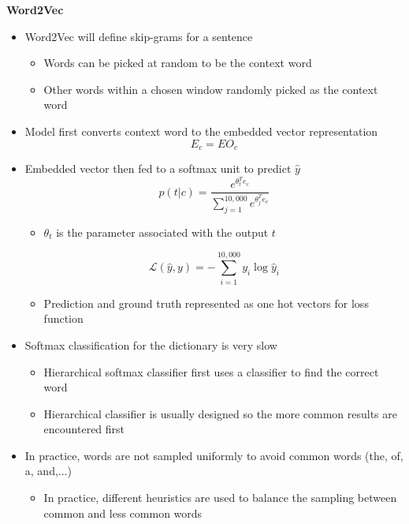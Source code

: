 \documentclass[12pt, letterpaper]{article}
\begin{document}
    \vspace{35mm}
    \textbf{Word2Vec}
    \begin{itemize}
        \item Word2Vec will define skip-grams for a sentence
        \begin{itemize}
            \item Words can be picked at random to be the context word
            \item Other words within a chosen window randomly picked as the context word
        \end{itemize}
        \item Model first converts context word to the embedded vector representation
        $$E_c=E O_c$$  
        \item Embedded vector then fed to a softmax unit to predict $\hat{y}$
        $$p(t|c)=\frac{e^{\theta_t^Te_c}}{\sum_{j=1}^{10,000}e^{\theta_j^Te_c}}$$
        \begin{itemize}
            \item $\theta_t$ is the parameter associated with the output $t$
        \end{itemize}
        $$\mathcal{L}(\hat{y},y)=-\sum_{i=1}^{10,000}y_i\log\hat{y}_i$$
        \begin{itemize}
            \item Prediction and ground truth represented as one hot vectors for loss function
        \end{itemize}
        \item Softmax classification for the dictionary is very slow 
        \begin{itemize}
            \item Hierarchical softmax classifier first uses a classifier to find the correct word 
            \item Hierarchical classifier is usually designed so the more common results are encountered first
        \end{itemize}
        \item In practice, words are not sampled uniformly to avoid common words (the, of, a, and,...)
        \begin{itemize}
            \item In practice, different heuristics are used to balance the sampling between common and less common words
        \end{itemize}
    \end{itemize}
    
\end{document}
